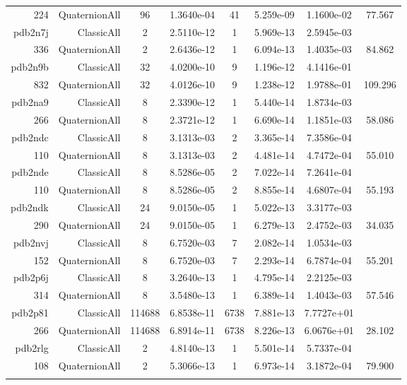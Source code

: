 \begin{xltabular}{\textwidth}{r|rcS[table-format=1.4e+2]cS[table-format=1.3e+2]S[table-format=1.4e+2]S[table-format=-1.3]}
224 & QuaternionAll & 96 & 1.3640e-04 & 41 & 5.259e-09 & 1.1600e-02 & 77.567\\  \addlinespace
pdb2n7j & ClassicAll & 2 & 2.5110e-12 & 1 & 5.969e-13 & 2.5945e-03 & \\
336 & QuaternionAll & 2 & 2.6436e-12 & 1 & 6.094e-13 & 1.4035e-03 & 84.862\\  \addlinespace
pdb2n9b & ClassicAll & 32 & 4.0200e-10 & 9 & 1.196e-12 & 4.1416e-01 & \\
832 & QuaternionAll & 32 & 4.0126e-10 & 9 & 1.238e-12 & 1.9788e-01 & 109.296\\  \addlinespace
pdb2na9 & ClassicAll & 8 & 2.3390e-12 & 1 & 5.440e-14 & 1.8734e-03 & \\
266 & QuaternionAll & 8 & 2.3721e-12 & 1 & 6.690e-14 & 1.1851e-03 & 58.086\\  \addlinespace
pdb2ndc & ClassicAll & 8 & 3.1313e-03 & 2 & 3.365e-14 & 7.3586e-04 & \\
110 & QuaternionAll & 8 & 3.1313e-03 & 2 & 4.481e-14 & 4.7472e-04 & 55.010\\  \addlinespace
pdb2nde & ClassicAll & 8 & 8.5286e-05 & 2 & 7.022e-14 & 7.2641e-04 & \\
110 & QuaternionAll & 8 & 8.5286e-05 & 2 & 8.855e-14 & 4.6807e-04 & 55.193\\  \addlinespace
pdb2ndk & ClassicAll & 24 & 9.0150e-05 & 1 & 5.022e-13 & 3.3177e-03 & \\
290 & QuaternionAll & 24 & 9.0150e-05 & 1 & 6.279e-13 & 2.4752e-03 & 34.035\\  \addlinespace
pdb2nvj & ClassicAll & 8 & 6.7520e-03 & 7 & 2.082e-14 & 1.0534e-03 & \\
152 & QuaternionAll & 8 & 6.7520e-03 & 7 & 2.293e-14 & 6.7874e-04 & 55.201\\  \addlinespace
pdb2p6j & ClassicAll & 8 & 3.2640e-13 & 1 & 4.795e-14 & 2.2125e-03 & \\
314 & QuaternionAll & 8 & 3.5480e-13 & 1 & 6.389e-14 & 1.4043e-03 & 57.546\\  \addlinespace
pdb2p81 & ClassicAll & 114688 & 6.8538e-11 & 6738 & 7.881e-13 & 7.7727e+01 & \\
266 & QuaternionAll & 114688 & 6.8914e-11 & 6738 & 8.226e-13 & 6.0676e+01 & 28.102\\  \addlinespace
pdb2rlg & ClassicAll & 2 & 4.8140e-13 & 1 & 5.501e-14 & 5.7337e-04 & \\
108 & QuaternionAll & 2 & 5.3066e-13 & 1 & 6.973e-14 & 3.1872e-04 & 79.900\\  \addlinespace

\end{xltabular}
